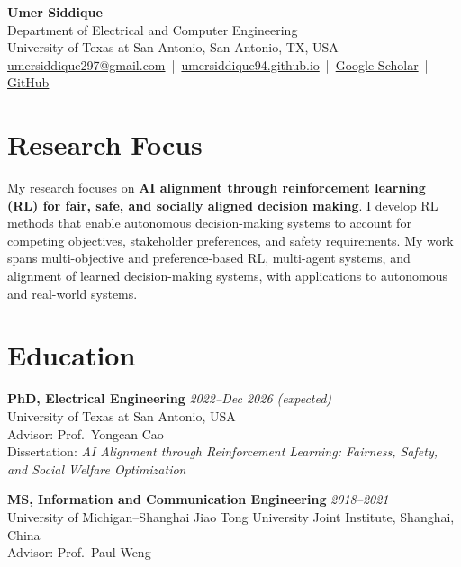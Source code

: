 \documentclass[letterpaper,11pt]{article}
\begin{document}
\begin{center}
    {\Huge \textbf{Umer Siddique}} \\[6pt]
    Department of Electrical and Computer Engineering \\
    University of Texas at San Antonio, San Antonio, TX, USA \\[4pt]
    \href{mailto:umersiddique297@gmail.com}{umersiddique297@gmail.com} \,|\,
    \href{https://umersiddique94.github.io/}{umersiddique94.github.io} \,|\,
    \href{https://scholar.google.com/citations?user=ukObVHAAAAAJ}{Google Scholar} \,|\,
    \href{https://github.com/umersiddique94}{GitHub}
\end{center}

\section*{Research Focus}
My research focuses on \textbf{AI alignment through reinforcement learning (RL) for fair, safe, and socially aligned decision making}. I develop RL methods that enable autonomous decision-making systems to account for competing objectives, stakeholder preferences, and safety requirements. My work spans multi-objective and preference-based RL, multi-agent systems, and alignment of learned decision-making systems, with applications to autonomous and real-world systems.

\section*{Education}
\textbf{PhD, Electrical Engineering} \hfill \textit{2022--Dec 2026 (expected)} \\
University of Texas at San Antonio, USA \\
Advisor: Prof.\ Yongcan Cao \\
Dissertation: \textit{AI Alignment through Reinforcement Learning: Fairness, Safety, and Social Welfare Optimization}

\textbf{MS, Information and Communication Engineering} \hfill \textit{2018--2021} \\
University of Michigan--Shanghai Jiao Tong University Joint Institute, Shanghai, China \\
Advisor: Prof.\ Paul Weng

\end{document}
